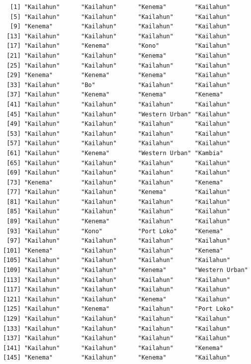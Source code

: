 \documentclass[
  letterpaper,
  DIV=11,
  numbers=noendperiod]{scrreprt}
\begin{document}
\begin{verbatim}
  [1] "Kailahun"      "Kailahun"      "Kenema"        "Kailahun"     
  [5] "Kailahun"      "Kailahun"      "Kailahun"      "Kailahun"     
  [9] "Kenema"        "Kailahun"      "Kailahun"      "Kailahun"     
 [13] "Kailahun"      "Kailahun"      "Kailahun"      "Kailahun"     
 [17] "Kailahun"      "Kenema"        "Kono"          "Kailahun"     
 [21] "Kailahun"      "Kailahun"      "Kenema"        "Kailahun"     
 [25] "Kailahun"      "Kailahun"      "Kailahun"      "Kailahun"     
 [29] "Kenema"        "Kenema"        "Kenema"        "Kailahun"     
 [33] "Kailahun"      "Bo"            "Kailahun"      "Kailahun"     
 [37] "Kailahun"      "Kenema"        "Kenema"        "Kenema"       
 [41] "Kailahun"      "Kailahun"      "Kailahun"      "Kailahun"     
 [45] "Kailahun"      "Kailahun"      "Western Urban" "Kailahun"     
 [49] "Kailahun"      "Kailahun"      "Kailahun"      "Kailahun"     
 [53] "Kailahun"      "Kailahun"      "Kailahun"      "Kailahun"     
 [57] "Kailahun"      "Kailahun"      "Kailahun"      "Kailahun"     
 [61] "Kailahun"      "Kenema"        "Western Urban" "Kambia"       
 [65] "Kailahun"      "Kailahun"      "Kailahun"      "Kailahun"     
 [69] "Kailahun"      "Kailahun"      "Kailahun"      "Kailahun"     
 [73] "Kenema"        "Kailahun"      "Kailahun"      "Kenema"       
 [77] "Kailahun"      "Kailahun"      "Kenema"        "Kailahun"     
 [81] "Kailahun"      "Kailahun"      "Kailahun"      "Kailahun"     
 [85] "Kailahun"      "Kailahun"      "Kailahun"      "Kailahun"     
 [89] "Kailahun"      "Kenema"        "Kailahun"      "Kailahun"     
 [93] "Kailahun"      "Kono"          "Port Loko"     "Kenema"       
 [97] "Kailahun"      "Kailahun"      "Kailahun"      "Kailahun"     
[101] "Kenema"        "Kailahun"      "Kailahun"      "Kenema"       
[105] "Kailahun"      "Kailahun"      "Kailahun"      "Kailahun"     
[109] "Kailahun"      "Kailahun"      "Kenema"        "Western Urban"
[113] "Kailahun"      "Kailahun"      "Kailahun"      "Kailahun"     
[117] "Kailahun"      "Kailahun"      "Kailahun"      "Kailahun"     
[121] "Kailahun"      "Kailahun"      "Kenema"        "Kailahun"     
[125] "Kailahun"      "Kenema"        "Kailahun"      "Port Loko"    
[129] "Kailahun"      "Kailahun"      "Kailahun"      "Kailahun"     
[133] "Kailahun"      "Kailahun"      "Kailahun"      "Kailahun"     
[137] "Kailahun"      "Kailahun"      "Kailahun"      "Kailahun"     
[141] "Kailahun"      "Kailahun"      "Kailahun"      "Kenema"       
[145] "Kenema"        "Kailahun"      "Kenema"        "Kailahun"     

\end{verbatim}
\end{document}
